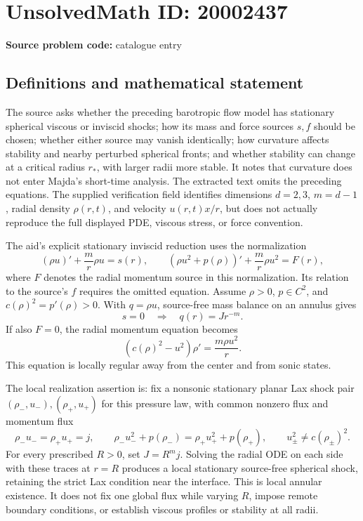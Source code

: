 \documentclass[11pt]{article}
\begin{document}
\section*{UnsolvedMath ID: 20002437}
\textbf{Source problem code:} catalogue entry
\subsection{Definitions and mathematical statement}
The source asks whether the preceding barotropic flow model has stationary spherical viscous or inviscid shocks; how its mass and force sources \(s,f\) should be chosen; whether either source may vanish identically; how curvature affects stability and nearby perturbed spherical fronts; and whether stability can change at a critical radius \(r_*\), with larger radii more stable. It notes that curvature does not enter Majda's short-time analysis. The extracted text omits the preceding equations. The supplied verification field identifies dimensions \(d=2,3\), \(m=d-1\), radial density \(\rho(r,t)\), and velocity \(u(r,t)x/r\), but does not actually reproduce the full displayed PDE, viscous stress, or force convention.

The aid's explicit stationary inviscid reduction uses the normalization
\[
 (\rho u)'+\frac mr\rho u=s(r),\qquad
 (\rho u^2+p(\rho))'+\frac mr\rho u^2=F(r),
\]
where \(F\) denotes the radial momentum source in this normalization. Its relation to the source's \(f\) requires the omitted equation. Assume \(\rho>0\), \(p\in C^2\), and \(c(\rho)^2=p'(\rho)>0\). With \(q=\rho u\), source-free mass balance on an annulus gives
\[
 s=0\quad\Longrightarrow\quad q(r)=Jr^{-m}.
\]
If also \(F=0\), the radial momentum equation becomes
\[
 (c(\rho)^2-u^2)\rho'=\frac{m\rho u^2}{r}.
\]
This equation is locally regular away from the center and from sonic states.

The local realization assertion is: fix a nonsonic stationary planar Lax shock pair \((\rho_-,u_-),(\rho_+,u_+)\) for this pressure law, with common nonzero flux and momentum flux
\[
 \rho_-u_-=\rho_+u_+=j,\qquad
 \rho_-u_-^2+p(\rho_-)=\rho_+u_+^2+p(\rho_+),
 \qquad u_\pm^2\ne c(\rho_\pm)^2.
\]
For every prescribed \(R>0\), set \(J=R^mj\). Solving the radial ODE on each side with these traces at \(r=R\) produces a local stationary source-free spherical shock, retaining the strict Lax condition near the interface. This is local annular existence. It does not fix one global flux while varying \(R\), impose remote boundary conditions, or establish viscous profiles or stability at all radii.
\end{document}
